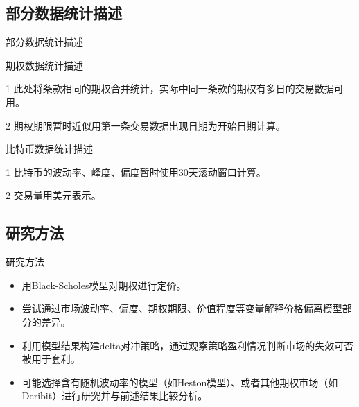 \documentclass[11pt,dark]{mathbeamer}
\begin{document}
\subsection{部分数据统计描述}
\begin{frame}[allowframebreaks]{部分数据统计描述}

\begin{table}
  \tiny
  \caption{期权数据统计描述}
  \begin{threeparttable}
    
  \begin{tablenotes}
    \tiny
    \item[1] 此处将条款相同的期权合并统计，实际中同一条款的期权有多日的交易数据可用。
    \item[2] 期权期限暂时近似用第一条交易数据出现日期为开始日期计算。
  \end{tablenotes}
  \end{threeparttable}
  
\end{table}
\begin{table}
  \tiny
  \caption{比特币数据统计描述}
  \begin{threeparttable}
    
  \begin{tablenotes}
    \tiny
    \item[1] 比特币的波动率、峰度、偏度暂时使用30天滚动窗口计算。
    \item[2] 交易量用美元表示。
  \end{tablenotes}
  \end{threeparttable}
  
\end{table}
\end{frame}

\subsection{研究方法}
\begin{frame}{研究方法}
  \begin{itemize}
    \item 用Black-Scholes模型对期权进行定价。
    \item 尝试通过市场波动率、偏度、期权期限、价值程度等变量解释价格偏离模型部分的差异。
    \item 利用模型结果构建delta对冲策略，通过观察策略盈利情况判断市场的失效可否被用于套利。
    \item 可能选择含有随机波动率的模型（如Heston模型）、或者其他期权市场（如Deribit）进行研究并与前述结果比较分析。
  \end{itemize}
\end{frame}
\end{document}
